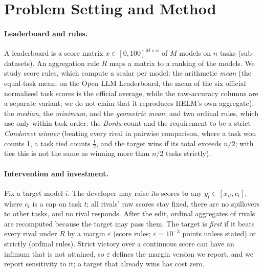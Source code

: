 \section{Problem Setting and Method}
\label{sec:method}

\paragraph{Leaderboard and rules.}
A leaderboard is a score matrix $x\in[0,100]^{M\times n}$ of $M$ models on $n$ tasks (sub-datasets).
An aggregation rule $R$ maps a matrix to a ranking of the models.
We study score rules, which compute a scalar per model: the arithmetic \emph{mean} (the equal-task mean; on the Open LLM Leaderboard, the mean of the six official normalised task scores is the official average, while the raw-accuracy columns are a separate variant; we do not claim that it reproduces HELM's own aggregate), the \emph{median}, the \emph{minimum}, and the \emph{geometric mean}; and two ordinal rules, which use only within-task order: the \emph{Borda} count and the requirement to be a strict \emph{Condorcet winner} (beating every rival in pairwise comparison, where a task won counts 1, a task tied counts $\tfrac12$, and the target wins if its total exceeds $n/2$; with ties this is not the same as winning more than $n/2$ tasks strictly).

\paragraph{Intervention and investment.}
Fix a target model $i$. The developer may raise its scores to any $y_t\in[x_{it},c_t]$, where $c_t$ is a cap on task $t$; all rivals' raw scores stay fixed, there are no spillovers to other tasks, and no rival responds.
After the edit, ordinal aggregates of rivals are recomputed because the target may pass them.
The target is \emph{first} if it beats every rival under $R$ by a margin $\varepsilon$ (score rules; $\varepsilon=10^{-3}$ points unless stated) or strictly (ordinal rules).
Strict victory over a continuous score can have an infimum that is not attained, so $\varepsilon$ defines the margin version we report, and we report sensitivity to it; a target that already wins has cost zero.

